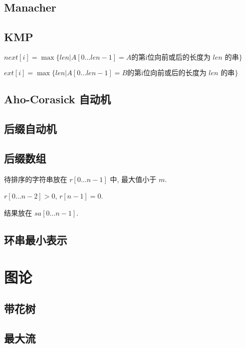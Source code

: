 \documentclass[landscape, twocolumn, 8pt, a4paper, twoside]{extarticle}
\begin{document}
  \subsection{Manacher}
    

  \subsection{KMP}
    $next[i] = \max\{len | A[0 \ldots len - 1] = A \textrm{的第i位向前或后的长度为 $len$ 的串} \}$

    $ext[i] = \max\{len | A[0 \ldots len - 1] = B \textrm{的第i位向前或后的长度为 $len$ 的串} \}$
    

  \subsection{Aho-Corasick 自动机}
    

  \subsection{后缀自动机}
    

  \subsection{后缀数组}
    待排序的字符串放在 $r[0 \ldots n - 1]$ 中, 最大值小于 $m$.
    
    $r[0 \ldots n - 2] > 0$, $r[n - 1] = 0$.
    
    结果放在 $sa[0 \ldots n - 1]$.
    
  
  \subsection{环串最小表示}
    

\section{图论}
  \subsection{带花树}
    

  \subsection{最大流}
    
  
\end{document}
